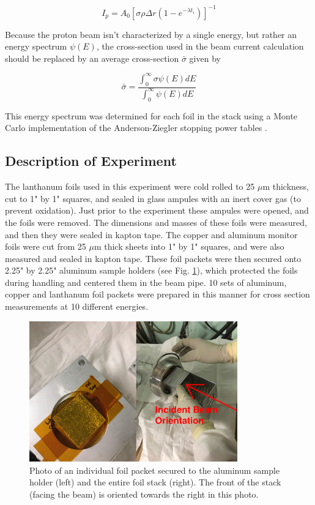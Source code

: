 \documentclass[aps,superscriptaddress,twocolumn,secnumarabic,balancelastpage,amsmath,amssymb,nofootinbib,floatfix]{revtex4-1}
\begin{document}
\begin{equation}
I_p =  A_0[\sigma \rho \Delta r (1-e^{-\lambda t_i})]^{-1}
\label{eq:beam_current}
\end{equation}

Because the proton beam isn't characterized by a single energy, but rather an energy spectrum $\psi(E)$, the cross-section used in the beam current calculation should be replaced by an average cross-section $\bar{\sigma}$ given by

\begin{equation}
\bar{\sigma} = \frac{\int_0^{\infty}\sigma\psi(E)dE}{\int_0^{\infty}\psi(E)dE}
\label{eq:avg_xs}
\end{equation}

This energy spectrum was determined for each foil in the stack using a Monte Carlo implementation of the Anderson-Ziegler stopping power tables \cite{ZIEGLER20101818}.



\subsection{Description of Experiment}

The lanthanum foils used in this experiment were cold rolled to 25 $\mu$m thickness, cut to 1" by 1" squares, and sealed in glass ampules with an inert cover gas (to prevent oxidation).  Just prior to the experiment these ampules were opened, and the foils were removed. The dimensions and masses of these foils were measured, and then they were sealed in kapton tape.  The copper and aluminum monitor foils were cut from 25 $\mu$m thick sheets into 1" by 1" squares, and were also measured and sealed in kapton tape.  These foil packets were then secured onto 2.25" by 2.25" aluminum sample holders (see Fig. \ref{fig:expt_photos}), which protected the foils during handling and centered them in the beam pipe.  10 sets of aluminum, copper and lanthanum foil packets were prepared in this manner for cross section measurements at 10 different energies.

\begin{figure}[htb]
\includegraphics[width=9cm]{photos/foil_stack.png}
\caption{Photo of an individual foil packet secured to the aluminum sample holder (left) and the entire foil stack (right).  The front of the stack (facing the beam) is oriented towards the right in this photo.   
}
\label{fig:expt_photos}
\end{figure}
\end{document}
